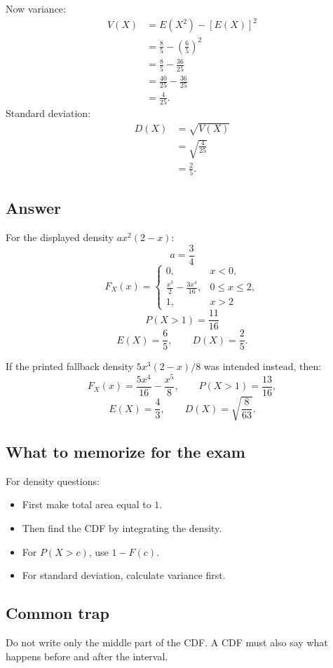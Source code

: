 \documentclass[11pt,a4paper]{article}
\begin{document}
Now variance:
\begin{align*}
V(X)
&=E(X^2)-[E(X)]^2\\
&=\frac{8}{5}-\left(\frac{6}{5}\right)^2\\
&=\frac{8}{5}-\frac{36}{25}\\
&=\frac{40}{25}-\frac{36}{25}\\
&=\frac{4}{25}.
\end{align*}
Standard deviation:
\begin{align*}
D(X)
&=\sqrt{V(X)}\\
&=\sqrt{\frac{4}{25}}\\
&=\frac{2}{5}.
\end{align*}

\subsection*{Answer}
For the displayed density \(a x^2(2-x)\):
\[
\boxed{a=\frac{3}{4}}
\]
\[
\boxed{
F_X(x)=
\begin{cases}
0, & x<0,\\
\frac{x^3}{2}-\frac{3x^4}{16}, & 0\le x\le 2,\\
1, & x>2
\end{cases}}
\]
\[
\boxed{P(X>1)=\frac{11}{16}}
\]
\[
\boxed{E(X)=\frac{6}{5}},\qquad
\boxed{D(X)=\frac{2}{5}}.
\]

If the printed fallback density \(5x^3(2-x)/8\) was intended instead, then:
\[
F_X(x)=\frac{5x^4}{16}-\frac{x^5}{8},\qquad
P(X>1)=\frac{13}{16},
\]
\[
E(X)=\frac{4}{3},\qquad
D(X)=\sqrt{\frac{8}{63}}.
\]

\subsection*{What to memorize for the exam}
For density questions:
\begin{itemize}[leftmargin=*]
    \item First make total area equal to \(1\).
    \item Then find the CDF by integrating the density.
    \item For \(P(X>c)\), use \(1-F(c)\).
    \item For standard deviation, calculate variance first.
\end{itemize}

\subsection*{Common trap}
Do not write only the middle part of the CDF. A CDF must also say what happens before and after the interval.
\end{document}
